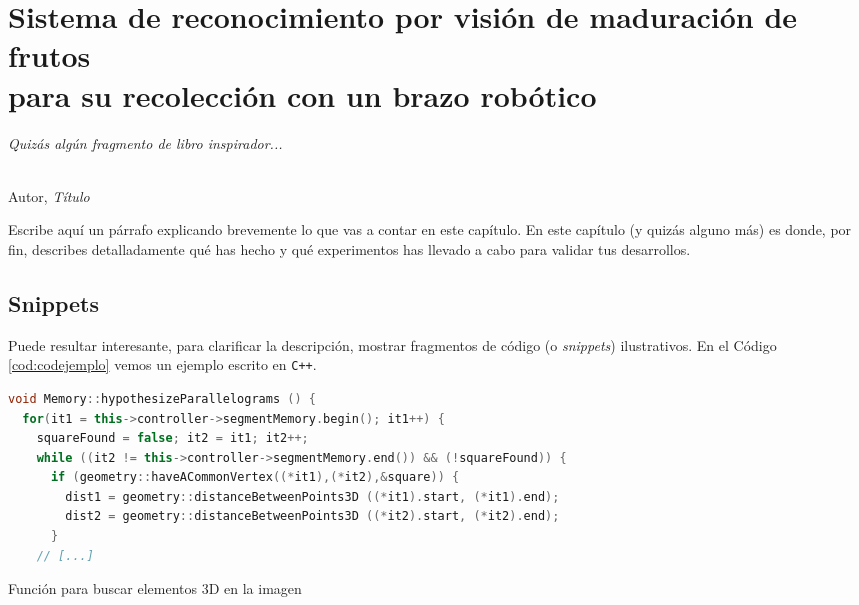 \chapter[Sistema de reconocimiento y recolección]{Sistema de reconocimiento por visión de maduración de frutos\\
  para su recolección con un brazo robótico}
\label{cap:capitulo5}


\begin{flushright}
\begin{minipage}[]{10cm}
\emph{Quizás algún fragmento de libro inspirador...}\\
\end{minipage}\\

Autor, \textit{Título}\\
\end{flushright}

\vspace{1cm}

Escribe aquí un párrafo explicando brevemente lo que vas a contar en este capítulo. En este capítulo (y quizás alguno más) es donde, por fin, describes detalladamente qué has hecho y qué experimentos has llevado a cabo para validar tus desarrollos.

\section{Snippets}

Puede resultar interesante, para clarificar la descripción, mostrar fragmentos de código (o \textit{snippets}) ilustrativos. En el Código \ref{cod:codejemplo} vemos un ejemplo escrito en \texttt{C++}.

\begin{code}[h]
\begin{lstlisting}[language=C++]
void Memory::hypothesizeParallelograms () {
  for(it1 = this->controller->segmentMemory.begin(); it1++) {
    squareFound = false; it2 = it1; it2++;
    while ((it2 != this->controller->segmentMemory.end()) && (!squareFound)) {
      if (geometry::haveACommonVertex((*it1),(*it2),&square)) {
        dist1 = geometry::distanceBetweenPoints3D ((*it1).start, (*it1).end);
        dist2 = geometry::distanceBetweenPoints3D ((*it2).start, (*it2).end);
      }
    // [...]
\end{lstlisting}
\caption[Función para buscar elementos 3D en la imagen]{Función para buscar elementos 3D en la imagen}
\label{cod:codejemplo}
\end{code}

